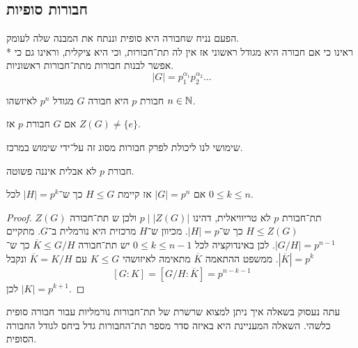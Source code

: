 \subsection{חבורות סופיות}
הפעם נניח שחבורה היא סופית וננתח את המבנה שלה לעומק. \\*
ראינו כי אם חבורה היא מגודל ראשוני אז אין לה תת־חבורות, וכי היא ציקלית, וראינו גם כי אפשר לבנות חבורות מתת־חבורות ראשוניות.
\[
	|G| = p_1^{\alpha_1} p_2^{\alpha_2} \dots
\]
\begin{definition}[חבורת p]
	חבורת $p$ היא חבורה $G$ מגודל $p^n$ לאיזשהו $n \in \mathbb{N}$.
\end{definition}
\begin{proposition}
	אם $G$ חבורת $p$ אז $Z(G) \ne \{ e \}$.
\end{proposition}
שימושי לנו ליכולת לפרק חבורות מסוג זה על־ידי שימוש במרכז.
\begin{conclusion}
	חבורת $p$ לא אבלית איננה פשוטה.
\end{conclusion}
\begin{conclusion}
	אם $|G| = p^n$ אז קיימת $H \le G$ כך ש־$|H| = p^k$ לכל $0 \le k \le n$.
\end{conclusion}
\begin{proof}
	$Z(G)$ תת־חבורת $p$ לא טריוויאלית, דהינו $p \mid |Z(G)|$ ולכן ש תת־חבורה $H \le Z(G)$ כך ש־$|H| = p$.
	מכיוון ש־$H$ מרכזית היא נורמלית ב־$G$.
	מתקיים $|G/H| = p^{n - 1}$.
	לכן באינדוקציה לכל $0 \le k \le n - 1$ יש תת־חבורה $\overline{K} \le G/H$ כך ש־$|\overline{K}| = p^k$.
	ממשפט ההתאמה $\overline{K}$ מתאימה לאיזושהי $K \le G$ עם $\overline{K} = K/H$ ונקבל
	\[
		[G : K ] = [G/H : \overline{K}] = p^{n - k - 1}
	\]
	לכן $|K| = p^{k + 1}$.
\end{proof}
עתה נעסוק בשאלה איך ניתן למצוא שרשרת של תת־חבורות נורמליות עבור חבורה סופית כלשהי.
השאלה המעניינת היא באיזה סדר מספר תת־החבורות גדל ביחס לגודל החבורה הסופית.

